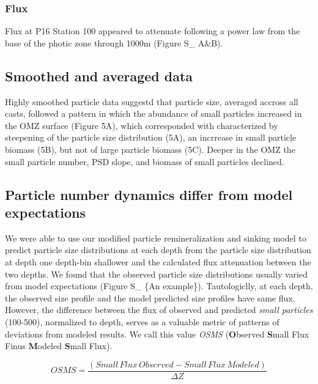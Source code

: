 \documentclass[]{article}
\begin{document}
\hypertarget{flux}{%
\subsubsection{Flux}\label{flux}}

Flux at P16 Station 100 appeared to attenuate following a power law from
the base of the photic zone through 1000m (Figure S\_ A\&B).

\hypertarget{smoothed-and-averaged-data}{%
\subsection{Smoothed and averaged
data}\label{smoothed-and-averaged-data}}

Highly smoothed particle data suggestd that particle size, averaged
accross all casts, followed a pattern in which the abundance of small
particles increased in the OMZ surface (Figure 5A), which corresponded
with characterized by steepening of the particle size distribution (5A),
an incrrease in small particle biomass (5B), but not of large particle
biomass (5C). Deeper in the OMZ the small particle number, PSD slope,
and biomass of small particles declined.

\hypertarget{particle-number-dynamics-differ-from-model-expectations}{%
\subsection{Particle number dynamics differ from model
expectations}\label{particle-number-dynamics-differ-from-model-expectations}}

We were able to use our modified particle remineralization and sinking
model to predict particle size distributions at each depth from the
particle size distribution at depth one depth-bin shallower and the
calculated flux attenuation between the two depths. We found that the
observed particle size distributions usually varied from model
expectations (Figure S\_ \{An example\}). Tautologiclly, at each depth,
the observed size profile and the model predicted size profiles have
same flux. However, the difference between the flux of observed and
predicted \emph{small particles} (100-500), normalized to depth, serves
as a valuable metric of patterns of deviations from modeled results. We
call this value \emph{OSMS} (\textbf{O}bserved \textbf{S}mall Flux Finus
\textbf{M}odeled \textbf{S}mall Flux).

\[ OSMS = \frac{(Small\,Flux\,Observed - Small\,Flux\,Modeled)}{\Delta Z}\]
\end{document}
